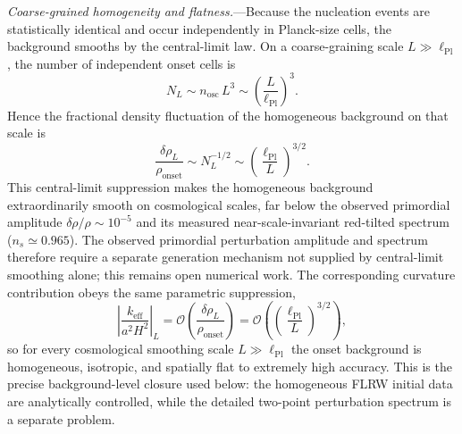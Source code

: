 \documentclass[aps,prd,onecolumn,superscriptaddress,nofootinbib,showpacs,12pt,notitlepage]{revtex4-2}
\renewcommand{\order}[1]{\mathcal{O}\!\left(#1\right)}
\begin{document}
\textit{Coarse-grained homogeneity and flatness.}---Because
the nucleation events are statistically identical and occur
independently in Planck-size cells, the background smooths by
the central-limit law.  On a coarse-graining scale
$L \gg \ell_{\mathrm{Pl}}$, the number of independent onset
cells is
\begin{equation}\label{eq:onset_cell_count}
  N_L \sim n_{\mathrm{osc}}\,L^3
  \sim \left(\frac{L}{\ell_{\mathrm{Pl}}}\right)^3.
\end{equation}
Hence the fractional density fluctuation of the homogeneous
background on that scale is
\begin{equation}\label{eq:onset_density_fluctuation}
  \frac{\delta\rho_L}{\rho_{\mathrm{onset}}}
  \sim N_L^{-1/2}
  \sim \left(\frac{\ell_{\mathrm{Pl}}}{L}\right)^{3/2}.
\end{equation}
This central-limit suppression makes the homogeneous
background extraordinarily smooth on cosmological scales,
far below the observed primordial amplitude
$\delta\rho/\rho \sim 10^{-5}$ and its measured
near-scale-invariant red-tilted spectrum
($n_s \simeq 0.965$).  The observed primordial
perturbation amplitude and spectrum therefore require a
separate generation mechanism not supplied by
central-limit smoothing alone; this remains open
numerical work.
The corresponding curvature contribution obeys the same
parametric suppression,
\begin{equation}\label{eq:onset_curvature_suppression}
  \left|\frac{k_{\mathrm{eff}}}{a^2H^2}\right|_L
  = \order{\frac{\delta\rho_L}{\rho_{\mathrm{onset}}}}
  = \order{\left(\frac{\ell_{\mathrm{Pl}}}{L}\right)^{3/2}},
\end{equation}
so for every cosmological smoothing scale
$L \gg \ell_{\mathrm{Pl}}$ the onset background is
homogeneous, isotropic, and spatially flat to extremely high
accuracy.  This is the precise background-level closure used
below: the homogeneous FLRW initial data are analytically
controlled, while the detailed two-point perturbation spectrum
is a separate problem.
\end{document}
